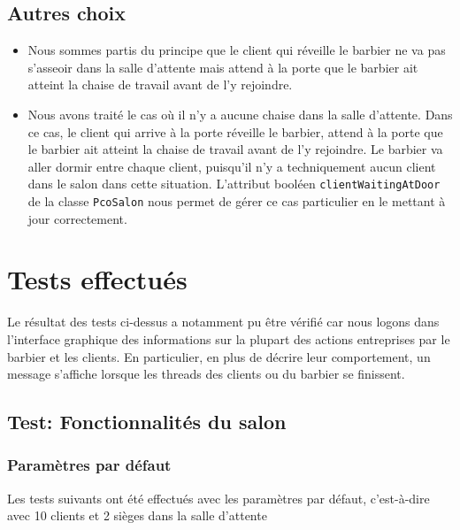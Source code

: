 \documentclass{article}
\begin{document}
\subsection*{Autres choix}

\begin{itemize}
    \item Nous sommes partis du principe que le client qui réveille le barbier ne va pas s'asseoir dans la salle d'attente mais attend
    à la porte que le barbier ait atteint la chaise de travail avant de l'y rejoindre.
    \item Nous avons traité le cas où il n'y a aucune chaise dans la salle d'attente. Dans ce cas, le client qui arrive à la porte 
    réveille le barbier, attend à la porte que le barbier ait atteint la chaise de travail avant de l'y rejoindre. Le barbier va aller
    dormir entre chaque client, puisqu'il n'y a techniquement aucun client dans le salon dans cette situation. L'attribut booléen 
    \texttt{clientWaitingAtDoor} de la classe \texttt{PcoSalon} nous permet de gérer ce cas particulier en le mettant à jour correctement. 
\end{itemize}

\section*{Tests effectués}

Le résultat des tests ci-dessus a notamment pu être vérifié car nous logons dans l'interface graphique des informations sur la plupart des 
actions entreprises par le barbier et les clients. En particulier, en plus de décrire leur comportement, un message s'affiche lorsque
les threads des clients ou du barbier se finissent.

\subsection*{Test: Fonctionnalités du salon}

\subsubsection*{Paramètres par défaut}

Les tests suivants ont été effectués avec les paramètres par défaut, c'est-à-dire avec 10 clients et 2 sièges dans la salle d'attente
\end{document}
